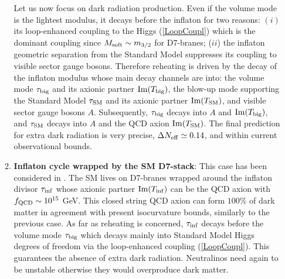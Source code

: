 \begin{itemize}
\begin{enumerate}
Let us now focus on dark radiation production. Even if the volume mode is the lightest modulus, it decays before the inflaton for two reasons: $(i)$ its loop-enhanced coupling to the Higgs (\ref{LoopCoupl}) which is the dominant coupling since $M_{\rm soft}\sim m_{3/2}$ for D7-branes; ($ii$) the inflaton geometric separation from the Standard Model suppresses its coupling to visible sector gauge bosons. Therefore reheating is driven by the decay of the inflaton modulus whose main decay channels are into: the volume mode $\tau_{\rm big}$ and its axionic partner ${\rm Im}(T_{\rm big})$, the blow-up mode supporting the Standard Model $\tau_{\rm SM}$ and its axionic partner ${\rm Im}(T_{\rm SM})$, and visible sector gauge bosons $A$. Subsequently, $\tau_{\rm big}$ decays into $A$ and ${\rm Im}(T_{\rm big})$, and $\tau_{\rm SM}$ decays into $A$ and the QCD axion ${\rm Im}(T_{\rm SM})$. The final prediction for extra dark radiation is very precise, $\Delta N_{\rm eff}\simeq 0.14$, and within current observational bounds. 

\item \textbf{Inflaton cycle wrapped by the SM D7-stack}: This case has been considered in \cite{Barnaby:2009wr,Cicoli:2010ha,Cicoli:2016olq}. The SM lives on D7-branes wrapped around the inflaton divisor $\tau_{\rm inf}$ whose axionic partner ${\rm Im}(T_{\rm inf})$ can be the QCD axion with $f_{\rm QCD}\sim 10^{15}$ GeV. This closed string QCD axion can form $100\%$ of dark matter in agreement with present isocurvature bounds, similarly to the previous case. As far as reheating is concerned, $\tau_{\rm inf}$ decays before the volume mode $\tau_{\rm big}$ which decays mainly into Standard Model Higgs degrees of freedom via the loop-enhanced coupling (\ref{LoopCoupl}). This guarantees the absence of extra dark radiation. Neutralinos need again to be unstable otherwise they would overproduce dark matter. 


\end{enumerate}
\end{itemize}
